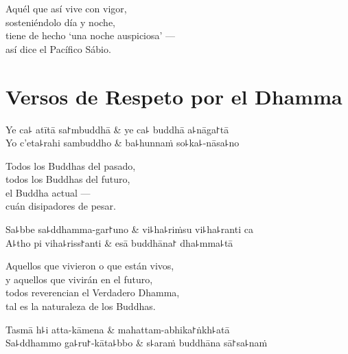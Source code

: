 \begin{english}
  Aquél que así vive con vigor,\\
  sosteniéndolo día y noche,\\
  tiene de hecho `una noche auspiciosa' ---\\
  así dice el Pacífico Sábio.
\end{english}

\chapter{Versos de Respeto por el Dhamma}


\begin{leader}
\end{leader}

\begin{twochants}
  Ye ca꜕ atītā sa꜓mbuddhā & ye ca꜕ buddhā a꜕nāga꜓tā \\
  Yo c'eta꜕rahi sambuddho & ba꜕hunnaṁ so꜕ka꜕-nāsa꜕no \\
\end{twochants}

\begin{english}
  Todos los Buddhas del pasado,\\
  todos los Buddhas del futuro,\\
  el Buddha actual ---\\
  cuán disipadores de pesar.
\end{english}

\begin{twochants}
  Sa꜕bbe sa꜕ddhamma-gar꜓uno & vi꜕ha꜕riṁsu vi꜕ha꜕ranti ca \\
  A꜕tho pi viha꜕riss꜓anti & esā buddhāna꜓ dha꜕mma꜕tā \\
\end{twochants}

\begin{english}
  Aquellos que vivieron o que están vivos,\\
  y aquellos que vivirán en el futuro,\\
  todos reverencian el Verdadero Dhamma,\\
  tal es la naturaleza de los Buddhas.
\end{english}

\begin{twochants}
  Tasmā h꜕i atta-kāmena & mahattam-abhika꜓ṅkh꜕atā \\
  Sa꜕ddhammo ga꜕ru꜓-kāta꜕bbo & s꜕araṁ buddhāna sā꜓sa꜕naṁ \\
\end{twochants}

